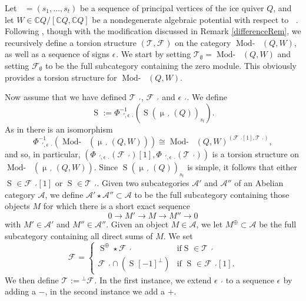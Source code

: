 \documentclass[a4paper,10pt]{amsart}
\DeclareMathOperator{\Simp}{S}
\renewcommand{\mu}{\upmu}
\DeclareMathOperator{\Tmod}{Mod-}
\newcommand{\Rmod}[1]{\Tmod\!#1}
\DeclareMathOperator{\HJac}{\widehat{Jac}}
\DeclareMathOperator{\Ss}{\overline{s}}
\begin{document}
Let $\Ss=(s_1,\ldots,s_t)$ be a sequence of principal vertices of the ice quiver $Q$, and let $W\in\mathbb{C}Q/[\mathbb{C}Q,\mathbb{C}Q]$ be a nondegenerate algebraic potential with respect to $\Ss$.  Following \cite{Na13}, though with the modification discussed in Remark \ref{differenceRem}, we recursively define a torsion structure $(\mathcal{T}_{\Ss},\mathcal{F}_{\Ss})$ on the category $\Rmod{\HJac(Q,W)}$, as well as a sequence of signs $\epsilon_{\Ss}$.  We start by setting $\mathcal{T}_{\emptyset}=\Rmod{\HJac(Q,W)}$ and setting $\mathcal{F}_{\emptyset}$ to be the full subcategory containing the zero module.  This obviously provides a torsion structure for $\Rmod{\HJac(Q,W)}$.  

Now assume that we have defined $\mathcal{T}_{\Ss'}$, $\mathcal{F}_{\Ss'}$ and $\epsilon_{\Ss'}$.  We define 
\[
\Simp_{\Ss}:=\Phi_{\Ss',\epsilon_{\Ss'}}^{-1}(\Simp(\mu_{\Ss'}(Q))_{s_t}).  
\]
As in \cite[Thm.3.4]{Na13} there is an isomorphism
\[
\Phi_{\Ss',\epsilon_{\Ss'}}^{-1}\left(\Rmod{\HJac(\mu_{\Ss'}(Q,W))}\right)\cong \Rmod{\HJac(Q,W)}^{(\mathcal{F}_{\Ss'}[1],\mathcal{T}_{\Ss'})},
\]
and so, in particular, $(\Phi_{\Ss',\epsilon_{\Ss'}}(\mathcal{F}_{\Ss'})[1],\Phi_{\Ss',\epsilon_{\Ss'}}(\mathcal{T}_{\Ss'}))$ is a torsion structure on $\Rmod{\HJac(\mu_{\Ss'}(Q,W))}$.  Since $\Simp(\mu_{\Ss'}(Q))_{s_t}$ is simple, it follows that either $\Simp_{\Ss}\in \mathcal{F}_{\Ss'}[1]$ or $\Simp_{\Ss}\in \mathcal{T}_{\Ss'}$.  Given two subcategories $\mathcal{A}'$ and $\mathcal{A}''$ of an Abelian category $\mathcal{A}$, we define $\mathcal{A}'\star\mathcal{A}''\subset \mathcal{A}$ to be the full subcategory containing those objects $M$ for which there is a short exact sequence
\[
0\rightarrow M'\rightarrow M\rightarrow M''\rightarrow 0
\]
with $M'\in\mathcal{A}'$ and $M''\in \mathcal{A}''$.  Given an object $M\in\mathcal{A}$, we let $M^{\oplus}\subset \mathcal{A}$ be the full subcategory containing all direct sums of $M$.  We set
\begin{equation}
\label{TSdef}
\mathcal{F}_{\Ss}=\begin{cases} \Simp_{\Ss}^{\oplus}\star\mathcal{F}_{\Ss'}& \mathrm{if } \Simp_{\Ss}\in \mathcal{T}_{\Ss'}\\ \mathcal{F}_{\Ss'}\cap (\Simp_{\Ss}[-1]^{\perp})&\textrm{if }\Simp_{\Ss}\in\mathcal{F}_{\Ss'}[1].\end{cases}
\end{equation}
We then define $\mathcal{T}_{\Ss}:={}^\perp\mathcal{F}_{\Ss}$.  In the first instance, we extend $\epsilon_{\Ss'}$ to a sequence $\epsilon_{\Ss}$ by adding a $-$, in the second instance we add a $+$.
\end{document}
